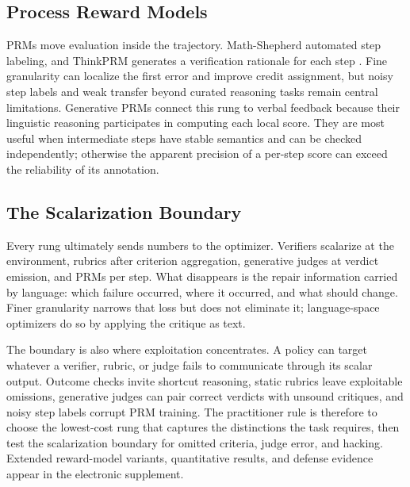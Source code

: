 \subsection{Process Reward Models}
\label{subsec:prm}

PRMs move evaluation inside the trajectory. Math-Shepherd automated step labeling, and ThinkPRM generates a verification rationale for each step \citep{wang2024mathshepherd,khalifa2025processrewardmodelsthink}. Fine granularity can localize the first error and improve credit assignment, but noisy step labels and weak transfer beyond curated reasoning tasks remain central limitations. Generative PRMs connect this rung to verbal feedback because their linguistic reasoning participates in computing each local score.
They are most useful when intermediate steps have stable semantics and can be checked independently; otherwise the apparent precision of a per-step score can exceed the reliability of its annotation.

\subsection{The Scalarization Boundary}
\label{subsec:scalarization}

Every rung ultimately sends numbers to the optimizer. Verifiers scalarize at the environment, rubrics after criterion aggregation, generative judges at verdict emission, and PRMs per step. What disappears is the repair information carried by language: which failure occurred, where it occurred, and what should change. Finer granularity narrows that loss but does not eliminate it; language-space optimizers do so by applying the critique as text.

The boundary is also where exploitation concentrates. A policy can target whatever a verifier, rubric, or judge fails to communicate through its scalar output. Outcome checks invite shortcut reasoning, static rubrics leave exploitable omissions, generative judges can pair correct verdicts with unsound critiques, and noisy step labels corrupt PRM training. The practitioner rule is therefore to choose the lowest-cost rung that captures the distinctions the task requires, then test the scalarization boundary for omitted criteria, judge error, and hacking. Extended reward-model variants, quantitative results, and defense evidence appear in the electronic supplement.
